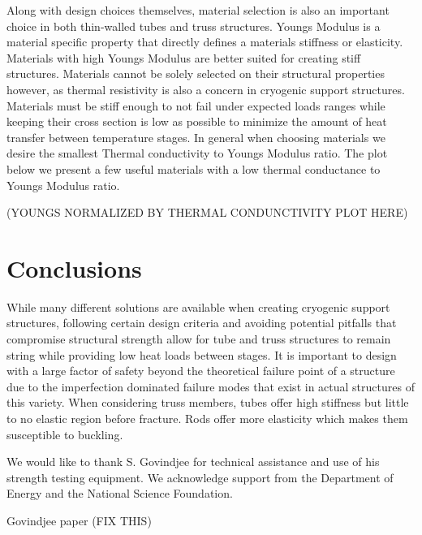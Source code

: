 \documentclass[final]{svjour2}
\begin{document}
Along with design choices themselves, material selection is also an important  choice in both thin-walled tubes and truss structures. Youngs Modulus is a material specific property that directly defines a materials stiffness or elasticity.  Materials with high Youngs Modulus are better suited for creating stiff structures. Materials cannot be solely selected on their structural properties however, as thermal resistivity is also a concern in cryogenic support structures.  Materials must be stiff enough to not fail under expected loads ranges while keeping their cross section is low as possible to minimize the amount of heat transfer between temperature stages.  In general when choosing materials we desire the smallest Thermal conductivity to Youngs Modulus ratio.  The plot below we present a few useful materials with a low thermal conductance to Youngs Modulus ratio.

(YOUNGS NORMALIZED BY THERMAL CONDUNCTIVITY PLOT HERE)

\section{Conclusions}
While many different solutions are available when creating cryogenic support structures, following certain design criteria and avoiding potential pitfalls that compromise structural strength allow for tube and truss structures to remain string while providing low heat loads between stages.  It is important to design with a large factor of safety beyond the theoretical failure point of a structure due to the imperfection dominated failure modes that exist in actual structures of this variety.  When considering truss members, tubes offer high stiffness but little to no elastic region before fracture.  Rods offer more elasticity which makes them susceptible to buckling.

\begin{acknowledgements}
We would like to thank S. Govindjee for technical assistance and use of his strength testing equipment. We acknowledge support from the Department of Energy and the National Science Foundation.
\end{acknowledgements}

\pagebreak

\begin{thebibliography}{99}

Govindjee paper (FIX THIS)

\end{thebibliography}
\end{document}

